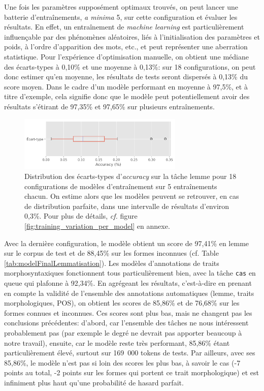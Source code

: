 Une fois les paramètres supposément optimaux trouvés, on peut lancer une batterie d'entraînements, \textit{a minima} 5, sur cette configuration et évaluer les résultats. En effet, un entraînement de \textit{machine learning }est particulièrement influençable par des phénomènes aléatoires, liés à l'initialisation des paramètres et poids, à l'ordre d'apparition des mots, etc., et peut représenter une aberration statistique. Pour l'expérience d'optimisation manuelle, on obtient une médiane des écarts-types à 0,10\% et une moyenne à 0,13\%: sur 18 configurations, on peut donc estimer qu'en moyenne, les résultats de tests seront dispersés à 0,13\% du score moyen. Dans le cadre d'un modèle performant en moyenne à 97,5\%, et à titre d'exemple, cela signifie donc que le modèle peut potentiellement avoir des résultats s'étirant de 97,35\% et 97,65\% sur plusieurs entraînements.

\begin{figure}[ht]
    \centering
    \includegraphics[width=0.7\textwidth]{figures/chap3/entrainement/Variance.png}
    \caption{Distribution des écarts-types d'\textit{accuracy} sur la tâche lemme pour 18 configurations de modèles d'entraînement sur 5 entraînements chacun. On estime alors que les modèles peuvent se retrouver, en cas de distribution parfaite, dans une intervalle de résultats d'environ 0,3\%. Pour plus de détails, \textit{cf.} figure \ref{fig:training_variation_per_model} en annexe.}
    \label{fig:training_variation}
\end{figure}

Avec la dernière configuration, le modèle obtient un score de 97,41\% en lemme sur le corpus de test et de 88,45\% sur les formes inconnues (cf. Table \ref{tab:modelFinalLemmatisation}). Les modèles d'annotations de traits morphosyntaxiques fonctionnent tous particulièrement bien, avec la tâche \texttt{cas} en queue qui plafonne à 92,34\%. En agrégeant les résultats, c'est-à-dire en prenant en compte la validité de l'ensemble des annotations automatiques (lemme, traits morphologiques, POS), on obtient les scores de 85,86\% et de 76,68\% sur les formes connues et inconnues. Ces scores sont plus bas, mais ne changent pas les conclusions précédentes: d'abord, car l'ensemble des tâches ne nous intéressent probablement pas (par exemple le degré ne devrait pas apporter beaucoup à notre travail), ensuite, car le modèle reste très performant, 85,86\% étant particulièrement élevé, surtout sur 169~000 tokens de tests. Par ailleurs, avec ses 85,86\%, le modèle n'est pas si loin des scores les plus bas, à savoir le cas (-7 points au total, -2 points sur les formes qui portent ce trait morphologique) et est infiniment plus haut qu'une probabilité de hasard parfait.

